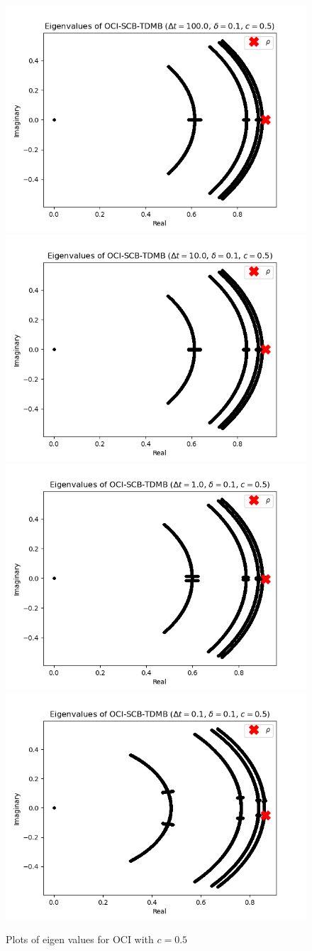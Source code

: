 \begin{figure}
    \includegraphics[width=.24\textwidth]{appendix/eig_plots/c0.5/mfp0.1dt100.0c0.5.png}
    \includegraphics[width=.24\textwidth]{appendix/eig_plots/c0.5/mfp0.1dt10.0c0.5.png}
    \includegraphics[width=.24\textwidth]{appendix/eig_plots/c0.5/mfp0.1dt1.0c0.5.png}
    \includegraphics[width=.24\textwidth]{appendix/eig_plots/c0.5/mfp0.1dt0.1c0.5.png}
    
    \caption{Plots of eigen values for OCI with $c=0.5$}
    \label{appendix:c5}
\end{figure}


